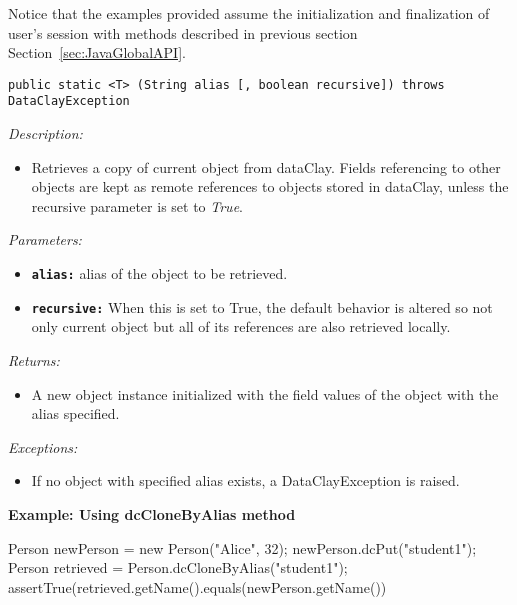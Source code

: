 Notice that the examples provided assume the initialization and finalization of user's session with methods described in previous section Section~\ref{sec:JavaGlobalAPI}.


\begin{dBox}
\texttt{public static <T>  (String alias [, boolean recursive]) \newline throws DataClayException}
\LINE

{\it Description:}

\begin{itemize}
    \item Retrieves a copy of current object from dataClay. Fields referencing to other objects are kept as remote references to objects stored in dataClay, unless the recursive parameter is set to \textit{True}.
\end{itemize}

{\it Parameters:}
\begin{itemize}
    \item \texttt{\bfseries alias:} alias of the object to be retrieved.
    \item \texttt{\bfseries recursive:} When this is set to True, the default behavior is altered so not only current object but all of its references are also retrieved locally.
\end{itemize}

{\it Returns:}

\begin{itemize}
    \item A new object instance initialized with the field values of the object with the alias specified.
\end{itemize}

{\it Exceptions:}

\begin{itemize}
    \item If no object with specified alias exists, a DataClayException is raised.
\end{itemize}

\end{dBox}

\begin{tBox}
\textcolor{basecolor} {\bf Example: Using dcCloneByAlias method}
\begin{java}
Person newPerson = new Person("Alice", 32);
newPerson.dcPut("student1");
Person retrieved = Person.dcCloneByAlias("student1");
assertTrue(retrieved.getName().equals(newPerson.getName())
\end{java}
\end{tBox}


